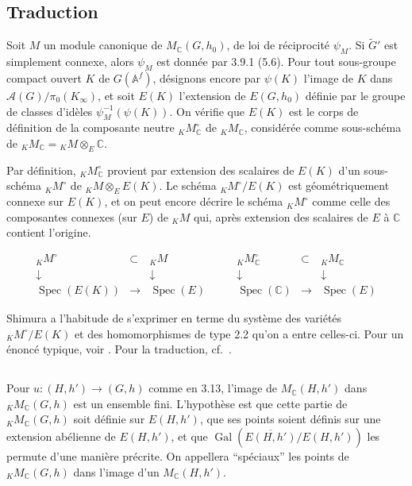 \documentclass[11pt]{amsart}
\theoremstyle{plain}
\theoremstyle{definition}
\DeclareMathOperator{\Gal}{Gal}
\DeclareMathOperator{\Spec}{Spec}
\newcommand{\CC}{\mathbb{C}}
\newcommand{\AAf}{\mathbb{A}^f}
\newcommand{\MC}{M_{\mathbb{C}}}
\begin{document}
\subsection{Traduction}

Soit $M$ un module canonique de $\MC(G,h_0)$, de loi de r\'eciprocit\'e $\psi_M$. Si $\tilde{G}'$ est simplement connexe, alors $\psi_M$ est donn\'ee par 3.9.1 (5.6). Pour tout sous-groupe compact ouvert $K$ de $G(\AAf)$, d\'esignons encore par $\psi(K)$ l'image de $K$ dans $\mathcal{A}(G)/\pi_0(K_\infty)$, et soit $E(K)$ l'extension de $E(G,h_0)$ d\'efinie par le groupe de classes d'id\`eles $\psi_M^{-1}(\psi(K))$. On v\'erifie que $E(K)$ est le corps de d\'efinition de la composante neutre ${}_K \MC^\circ$ de ${}_K \MC$, consid\'er\'ee comme sous-sch\'ema de ${}_K \MC = {}_K M \otimes_E \CC$.

Par d\'efinition, ${}_K \MC^\circ$ provient par extension des scalaires de $E(K)$ d'un sous-sch\'ema ${}_K M^\circ$ de ${}_K M \otimes_E E(K)$. Le sch\'ema ${}_K M^\circ/E(K)$ est g\'eom\'etriquement connexe sur $E(K)$, et on peut encore d\'ecrire le sch\'ema ${}_K M^\circ$ comme celle des composantes connexes (sur $E$) de ${}_K M$ qui, apr\`es extension des scalaires de $E$ \`a $\CC$ contient l'origine.

\[
\begin{array}{ccc}
{}_K M^\circ & \subset & {}_K M \\
\downarrow & & \downarrow \\
\Spec(E(K)) & \longrightarrow & \Spec(E)
\end{array}
\qquad
\begin{array}{ccc}
{}_K \MC^\circ & \subset & {}_K \MC \\
\downarrow & & \downarrow \\
\Spec(\CC) & \longrightarrow & \Spec(E)
\end{array}
\]

Shimura a l'habitude de s'exprimer en terme du syst\`eme des vari\'et\'es ${}_K M^\circ/E(K)$ et des homomorphismes de type 2.2 qu'on a entre celles-ci. Pour un \'enonc\'e typique, voir \cite[page 146]{Sh5}. Pour la traduction, cf.\ \cite[2.7]{Sh5}.

\subsection{}

Pour $u : (H,h') \to (G,h)$ comme en 3.13, l'image de $\MC(H,h')$ dans ${}_K \MC(G,h)$ est un ensemble fini. L'hypoth\`ese est que cette partie de ${}_K \MC(G,h)$ soit d\'efinie sur $E(H,h')$, que ses points soient d\'efinis sur une extension ab\'elienne de $E(H,h')$, et que $\Gal(\overline{E(H,h')}/E(H,h'))$ les permute d'une mani\`ere pr\'ecrite. On appellera ``sp\'eciaux'' les points de ${}_K \MC(G,h)$ dans l'image d'un $\MC(H,h')$.
\end{document}
